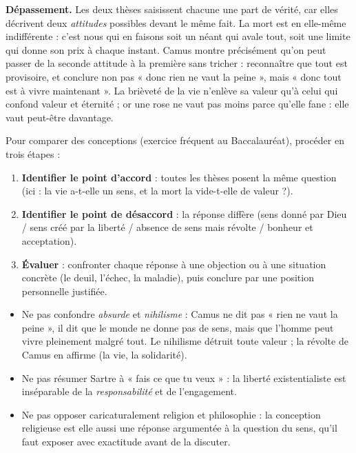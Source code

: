 \documentclass[11pt]{article}
\begin{document}
\textbf{Dépassement.} Les deux thèses saisissent chacune une part de vérité, car elles décrivent deux \emph{attitudes} possibles devant le même fait. La mort est en elle-même indifférente : c'est nous qui en faisons soit un néant qui avale tout, soit une limite qui donne son prix à chaque instant. Camus montre précisément qu'on peut passer de la seconde attitude à la première sans tricher : reconnaître que tout est provisoire, et conclure non pas « donc rien ne vaut la peine », mais « donc tout est à vivre maintenant ». La brièveté de la vie n'enlève sa valeur qu'à celui qui confond valeur et éternité ; or une rose ne vaut pas moins parce qu'elle fane : elle vaut peut-être davantage.

\begin{methode}
Pour comparer des conceptions (exercice fréquent au Baccalauréat), procéder en trois étapes :
\begin{enumerate}
  \item \textbf{Identifier le point d'accord} : toutes les thèses posent la même question (ici : la vie a-t-elle un sens, et la mort la vide-t-elle de valeur ?).
  \item \textbf{Identifier le point de désaccord} : la réponse diffère (sens donné par Dieu / sens créé par la liberté / absence de sens mais révolte / bonheur et acceptation).
  \item \textbf{Évaluer} : confronter chaque réponse à une objection ou à une situation concrète (le deuil, l'échec, la maladie), puis conclure par une position personnelle justifiée.
\end{enumerate}
\end{methode}

\begin{attention}
\begin{itemize}
  \item Ne pas confondre \emph{absurde} et \emph{nihilisme} : Camus ne dit pas « rien ne vaut la peine », il dit que le monde ne donne pas de sens, mais que l'homme peut vivre pleinement malgré tout. Le nihilisme détruit toute valeur ; la révolte de Camus en affirme (la vie, la solidarité).
  \item Ne pas résumer Sartre à « fais ce que tu veux » : la liberté existentialiste est inséparable de la \emph{responsabilité} et de l'engagement.
  \item Ne pas opposer caricaturalement religion et philosophie : la conception religieuse est elle aussi une réponse argumentée à la question du sens, qu'il faut exposer avec exactitude avant de la discuter.
\end{itemize}
\end{attention}
\end{document}
